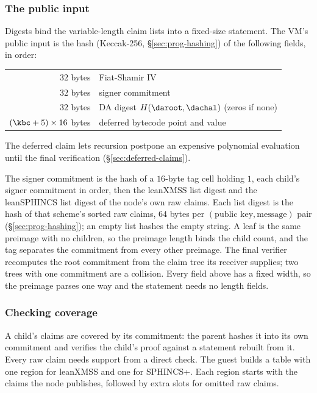 \subsubsection{The public input}\label{sec:rec-stmt}

Digests bind the variable-length claim lists into a fixed-size statement. The VM's public input is the hash (Keccak-256, \S\ref{sec:prog-hashing}) of the following fields, in order:
\begin{center}
\begin{tabular}{@{}rl@{}}
\hline
$32$ bytes & Fiat-Shamir IV\\
$32$ bytes & signer commitment\\
$32$ bytes & DA digest $H(\daroot,\dachal)$ (zeros if none)\\
$(\kbc+5)\times16$ bytes & deferred bytecode point and value\\
\hline
\end{tabular}
\end{center}
The deferred claim lets recursion postpone an expensive polynomial evaluation until the final verification (\S\ref{sec:deferred-claims}).

The signer commitment is the hash of a $16$-byte tag cell holding $1$, each child's signer commitment in order, then the leanXMSS list digest and the leanSPHINCS list digest of the node's own raw claims. Each list digest is the hash of that scheme's sorted raw claims, $64$ bytes per $(\text{public key},\text{message})$ pair (\S\ref{sec:prog-hashing}); an empty list hashes the empty string. A leaf is the same preimage with no children, so the preimage length binds the child count, and the tag separates the commitment from every other preimage. The final verifier recomputes the root commitment from the claim tree its receiver supplies; two trees with one commitment are a collision. Every field above has a fixed width, so the preimage parses one way and the statement needs no length fields.

\subsubsection{Checking coverage}

A child's claims are covered by its commitment: the parent hashes it into its own commitment and verifies the child's proof against a statement rebuilt from it. Every raw claim needs support from a direct check. The guest builds a table with one region for leanXMSS and one for SPHINCS+. Each region starts with the claims the node publishes, followed by extra slots for omitted raw claims.

